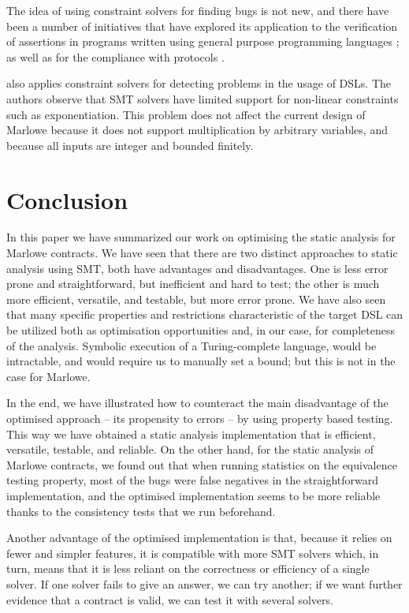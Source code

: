 \documentclass[english,runningheads]{llncs}
\begin{document}
The idea of using constraint solvers for finding bugs is not new,
and there have been a number of initiatives that have explored its
application to the verification of assertions in programs written
using general purpose programming languages \cite{gulwani2008program,jackson2000finding};
as well as for the compliance with protocols
\cite{ball2001automatically,xie2005saturn}.

\cite{keshishzadeh2013early} also applies constraint solvers for
detecting problems in the usage of DSLs. The authors observe that
SMT solvers have limited support for non-linear constraints such as
exponentiation. This problem does not affect the current design of
Marlowe because it does not support multiplication by arbitrary variables,
and because all inputs are integer and bounded finitely.




\section{Conclusion}

In this paper we have summarized our work
on optimising the static analysis for Marlowe contracts. We have seen
that there are two distinct approaches to static analysis using SMT,
both have advantages and disadvantages. One is less error prone and
straightforward, but inefficient and hard to test; the other 
is much more efficient, versatile, and testable, but more error prone.
We have also seen that many specific properties and restrictions characteristic
of the target DSL can be utilized both as optimisation opportunities
and, in our case, for completeness of the analysis. Symbolic execution
of a Turing-complete language, would be intractable,
and would require us to manually set a bound; but this is not in the
case for Marlowe.

In the end, we have illustrated how to counteract the main disadvantage
of the optimised approach -- its propensity to errors -- by using property
based testing. This way we have obtained a static analysis implementation
that is efficient, versatile, testable, and reliable. 
On the other hand, for the static analysis of Marlowe contracts, we
found out that when running statistics on the equivalence testing
property, most of the bugs were false negatives in the straightforward
implementation, and the optimised implementation seems to be more
reliable thanks to the consistency tests that we run beforehand.

Another advantage of the optimised implementation is that, because
it relies on fewer and simpler features, it is compatible with more
SMT solvers which, in turn, means that it is less reliant on the
correctness or efficiency of a single solver. If one solver fails to give
an answer, we can try another; if we want further evidence that a
contract is valid, we can test it with several solvers.
\end{document}

